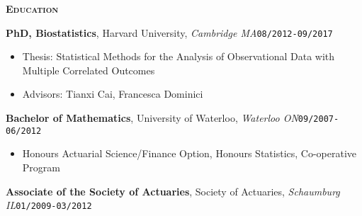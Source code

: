 \documentclass[10pt,english]{article}
\begin{document}
\vspace{3mm}

\begin{mdframed}[backgroundcolor=bgcolor,linewidth=3pt]
\textbf{\textsc{Education}}
\end{mdframed}

\textbf{PhD, Biostatistics}, Harvard University, \textit{Cambridge MA}\hfill \texttt{08/2012-09/2017}
\begin{itemize}
\item Thesis: Statistical Methods for the Analysis of Observational Data with Multiple Correlated Outcomes
\item Advisors: Tianxi Cai, Francesca Dominici
\end{itemize}

\vspace{2mm}

\textbf{Bachelor of Mathematics}, University of Waterloo, \textit{Waterloo ON}\hfill \texttt{09/2007-06/2012}
\begin{itemize}
\item Honours Actuarial Science/Finance Option, Honours Statistics, Co-operative
Program
\end{itemize}

\vspace{2mm}

\textbf{Associate of the Society of Actuaries}, Society of Actuaries, \textit{Schaumburg IL}\hfill \texttt{01/2009-03/2012}
\end{document}
